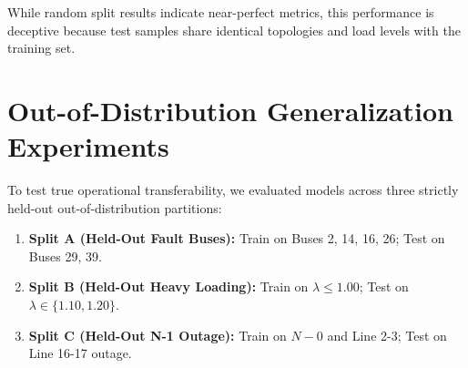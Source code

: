 \documentclass[journal]{IEEEtran}
\begin{document}
While random split results indicate near-perfect metrics, this performance is deceptive because test samples share identical topologies and load levels with the training set.

\balance
\section{Out-of-Distribution Generalization Experiments}
To test true operational transferability, we evaluated models across three strictly held-out out-of-distribution partitions:
\begin{enumerate}
    \item \textbf{Split A (Held-Out Fault Buses):} Train on Buses 2, 14, 16, 26; Test on Buses 29, 39.
    \item \textbf{Split B (Held-Out Heavy Loading):} Train on $\lambda \le 1.00$; Test on $\lambda \in \{1.10, 1.20\}$.
    \item \textbf{Split C (Held-Out N-1 Outage):} Train on $N-0$ and Line 2-3; Test on Line 16-17 outage.
\end{enumerate}
\end{document}

